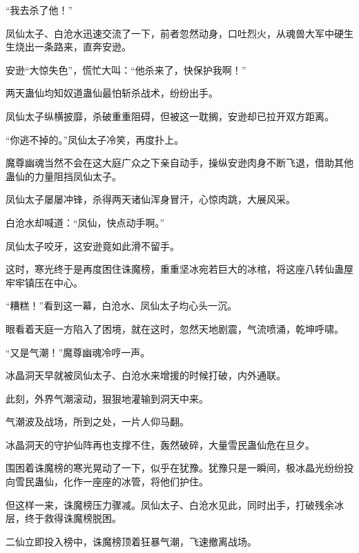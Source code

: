 \begin{this_body}
“我去杀了他！”

凤仙太子、白沧水迅速交流了一下，前者忽然动身，口吐烈火，从魂兽大军中硬生生烧出一条路来，直奔安逊。

安逊“大惊失色”，慌忙大叫：“他杀来了，快保护我啊！”

两天蛊仙均知奴道蛊仙最怕斩杀战术，纷纷出手。

凤仙太子纵横披靡，杀破重重阻碍，但被这一耽搁，安逊却已拉开双方距离。

“你逃不掉的。”凤仙太子冷笑，再度扑上。

魔尊幽魂当然不会在这大庭广众之下亲自动手，操纵安逊肉身不断飞退，借助其他蛊仙的力量阻挡凤仙太子。

凤仙太子屡屡冲锋，杀得两天诸仙浑身冒汗，心惊肉跳，大展风采。

白沧水却喊道：“凤仙，快点动手啊。”

凤仙太子咬牙，这安逊竟如此滑不留手。

这时，寒光终于是再度困住诛魔榜，重重坚冰宛若巨大的冰棺，将这座八转仙蛊屋牢牢镇压在中心。

“糟糕！”看到这一幕，白沧水、凤仙太子均心头一沉。

眼看着天庭一方陷入了困境，就在这时，忽然天地剧震，气流喷涌，乾坤呼啸。

“又是气潮！”魔尊幽魂冷哼一声。

冰晶洞天早就被凤仙太子、白沧水来增援的时候打破，内外通联。

此刻，外界气潮滚动，狠狠地灌输到洞天中来。

气潮波及战场，所到之处，一片人仰马翻。

冰晶洞天的守护仙阵再也支撑不住，轰然破碎，大量雪民蛊仙危在旦夕。

围困着诛魔榜的寒光晃动了一下，似乎在犹豫。犹豫只是一瞬间，极冰晶光纷纷投向雪民蛊仙，化作一座座的冰管，将他们护住。

但这样一来，诛魔榜压力骤减。凤仙太子、白沧水见此，同时出手，打破残余冰层，终于救得诛魔榜脱困。

二仙立即投入榜中，诛魔榜顶着狂暴气潮，飞速撤离战场。

\end{this_body}

